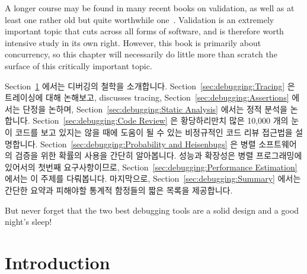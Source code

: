 A longer course may be found in many recent books on validation, as
well as at least one rather old but quite worthwhile
one~\cite{GlenfordJMyers1979}.
Validation is an extremely important topic that cuts across all forms
of software, and is therefore worth intensive study in its own right.
However, this book is primarily about concurrency, so this chapter
will necessarily do little more than scratch the surface of this
critically important topic.
\fi

Section~\ref{sec:debugging:Introduction}
에서는 디버깅의 철학을 소개합니다.
Section~\ref{sec:debugging:Tracing}
은 트레이싱에 대해 논해보고,
discusses tracing,
Section~\ref{sec:debugging:Assertions}
에서는 단정을 논하며,
Section~\ref{sec:debugging:Static Analysis}
에서는 정적 분석을 논합니다.
Section~\ref{sec:debugging:Code Review}
은 황당하리만치 많은 10,000 개의 눈이 코드를 보고 있지는 않을 때에 도움이 될 수
있는 비정규적인 코드 리뷰 접근법을 설명합니다.
Section~\ref{sec:debugging:Probability and Heisenbugs}
은 병렬 소프트웨어의 검증을 위한 확률의 사용을 간단히 알아봅니다.
성능과 확장성은 병렬 프로그래밍에 있어서의 첫번째 요구사항이므로,
Section~\ref{sec:debugging:Performance Estimation} 에서는 이 주제를 다뤄봅니다.
마지막으로,
Section~\ref{sec:debugging:Summary}
에서는 간단한 요약과 피해야할 통계적 함정들의 짧은 목록을 제공합니다.

But never forget that the two best debugging tools are a solid design
and a good night's sleep!

\section{Introduction}
\label{sec:debugging:Introduction}

